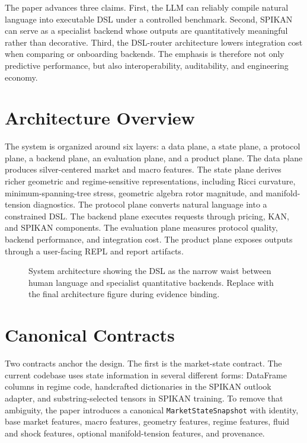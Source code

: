 \documentclass[11pt]{article}
\begin{document}
The paper advances three claims. First, the LLM can reliably compile natural
language into executable DSL under a controlled benchmark. Second, SPIKAN can
serve as a specialist backend whose outputs are quantitatively meaningful rather
than decorative. Third, the DSL-router architecture lowers integration cost when
comparing or onboarding backends. The emphasis is therefore not only predictive
performance, but also interoperability, auditability, and engineering economy.

\section{Architecture Overview}

The system is organized around six layers: a data plane, a state plane, a
protocol plane, a backend plane, an evaluation plane, and a product plane. The
data plane produces silver-centered market and macro features. The state plane
derives richer geometric and regime-sensitive representations, including Ricci
curvature, minimum-spanning-tree stress, geometric algebra rotor magnitude, and
manifold-tension diagnostics. The protocol plane converts natural language into
a constrained DSL. The backend plane executes requests through pricing, KAN, and
SPIKAN components. The evaluation plane measures protocol quality, backend
performance, and integration cost. The product plane exposes outputs through a
user-facing REPL and report artifacts.

\begin{figure}[H]
  \centering
  \caption{System architecture showing the DSL as the narrow waist between human
  language and specialist quantitative backends. Replace with the final
  architecture figure during evidence binding.}
  \label{fig:architecture}
\end{figure}

\section{Canonical Contracts}

Two contracts anchor the design. The first is the market-state contract. The
current codebase uses state information in several different forms: DataFrame
columns in regime code, handcrafted dictionaries in the SPIKAN outlook adapter,
and substring-selected tensors in SPIKAN training. To remove that ambiguity, the
paper introduces a canonical \texttt{MarketStateSnapshot} with identity, base
market features, macro features, geometry features, regime features, fluid and
shock features, optional manifold-tension features, and provenance.
\end{document}

